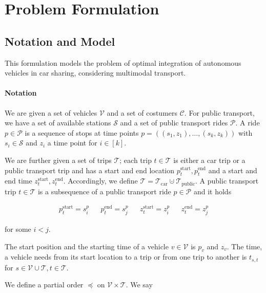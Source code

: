 \section{Problem Formulation}

\subsection{Notation and Model}

This formulation models the problem of optimal integration of autonomous vehicles in car sharing, considering multimodal transport.

\paragraph{Notation} \parfill

We are given a set of vehicles $\mathcal{V}$ and a set of costumers $\mathcal{C}$. For public transport, we have a set of available stations $\mathcal{S}$ and a set of public transport rides $\mathcal{P}$. A ride $p\in \mathcal{P}$ is a sequence of stops at time points $p=\left(\left(s_1,z_1\right),\dots,\left(s_k,z_k\right)\right)$ with $s_i\in\mathcal{S}$ and $z_i$ a time point for $i\in[k]$. 

We are further given a set of trips $\mathcal{T}$; each trip $t\in\mathcal{T}$ is either a car trip or a public transport trip and has a start and end location $p_t^{\operatorname{start}}, p_t^{\operatorname{end}}$ and a start and end time $z_t^{\operatorname{start}}, z_t^{\operatorname{end}}$. Accordingly, we define $\mathcal{T} = \mathcal{T}_{\operatorname{car}}\cupdot\mathcal{T}_{\operatorname{public}}$. A public transport trip $t\in\mathcal{T}$ is a subsequence of a public transport ride $p\in\mathcal{P}$ and it holds

\begin{align*}
	p_t^{\operatorname{start}} = s^p_i & & p_t^{\operatorname{end}} = s^p_j & & z_t^{\operatorname{start}} = z^p_i & & z_t^{\operatorname{end}} = z^p_j
\end{align*}

for some $i<j$.

The start position and the starting time of a vehicle $v\in\mathcal{V}$ is $p_v$ and $z_v$. The time, a vehicle needs from its start location to a trip or from one trip to another is $t_{s,t}$ for $s\in\mathcal{V}\cup\mathcal{T}, t\in\mathcal{T}$.

We define a partial order $\preceq$ on $\mathcal{V}\times\mathcal{T}$. We say

